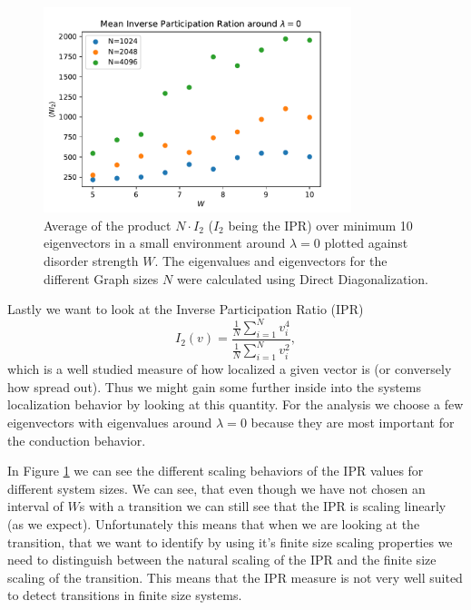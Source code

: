 \documentclass[../main.tex]{subfiles}
\begin{document}
\begin{figure}[htpb]
    \centering
    \includegraphics[width=0.8\textwidth]{../figures/ex3_inverse_particitpation_ratio.pdf}
    \caption{
        Average of the product $N \cdot I_2$ ($I_2$ being the IPR) over minimum \num{10} eigenvectors in a small environment around $\lambda = 0$ plotted against disorder strength $W$.
        The eigenvalues and eigenvectors for the different Graph sizes $N$ were calculated using Direct Diagonalization.
    }
    \label{fig:ipr_direct_diagonalization}
\end{figure}

Lastly we want to look at the Inverse Participation Ratio (IPR) 
\[
    I_2(v) = \frac{\frac{1}{N}\sum_{i=1}^{N} v_i^{4}}{\frac{1}{N}\sum_{i = 1}^{N} v_i^2}
,\] 
which is a well studied measure of how localized a given vector is (or conversely how spread out).
Thus we might gain some further inside into the systems localization behavior by looking at this quantity.
For the analysis we choose a few eigenvectors with eigenvalues around $\lambda = 0$ because they are most important for the conduction behavior.
\par

In Figure \ref{fig:ipr_direct_diagonalization} we can see the different scaling behaviors of the IPR values for different system sizes.
We can see, that even though we have not chosen an interval of $W$s with a transition we can still see that the IPR is scaling linearly (as we expect).
Unfortunately this means that when we are looking at the transition, that we want to identify by using it's finite size scaling properties we need to distinguish between the natural scaling of the IPR and the finite size scaling of the transition.
This means that the IPR measure is not very well suited to detect transitions in finite size systems.


\ifSubfilesClassLoaded{
}{
    \newpage
}
\end{document}
